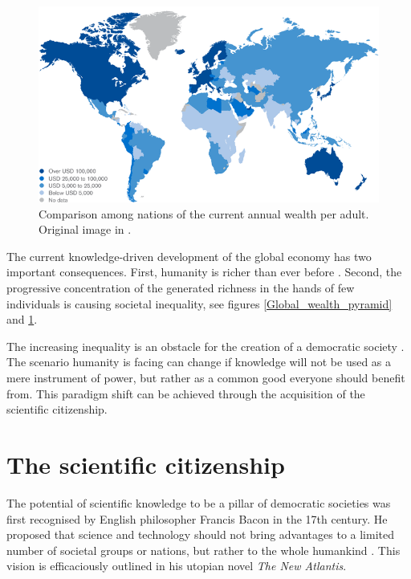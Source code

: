 \begin{figure}[!t] 
 \begin{center}
 \includegraphics[scale=0.4]{Images/World_wealth_levels.png}
 \caption{Comparison among nations of the current annual wealth per adult. Original image in \cite{Kersley}.}
 \label{World_wealth_levels}
 \end{center}
\end{figure}

The current knowledge-driven development of the global economy has two important consequences. First, humanity is richer than ever before \cite{Maddison}. Second, the progressive concentration of the generated richness in the hands of few individuals is causing societal inequality, see figures \ref{Global_wealth_pyramid} and \ref{World_wealth_levels}. 

The increasing inequality is an obstacle for the creation of a democratic society \cite{Mckenna}. The scenario humanity is facing can change if knowledge will not be used as a mere instrument of power, but rather as a common good everyone should benefit from. This paradigm shift can be achieved through the acquisition of the scientific citizenship.

\section{The scientific citizenship} \label{The_scientific_citizenship}
The potential of scientific knowledge to be a pillar of democratic societies was first recognised by English philosopher Francis Bacon in the 17th century. He proposed that science and technology should not bring advantages to a limited number of societal groups or nations, but rather to the whole humankind \cite{Zagorin}. This vision is efficaciously outlined in his utopian novel \textit{The New Atlantis}.

